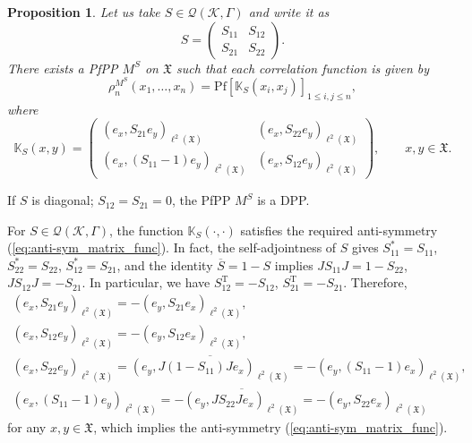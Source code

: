 \documentclass[11pt]{article}
\numberwithin{equation}{section}
\numberwithin{equation}{section}
\newtheorem{Proposition}[Theorem]{Proposition}
 { \theoremstyle{definition}
\newtheorem{Definition}[Theorem]{Definition}
\newtheorem{Example}[Theorem]{Example}
\newtheorem{Remark}[Theorem]{Remark} }
\newcommand{\mfrak}[1]{\mathfrak{#1}}
\newcommand{\mcal}[1]{\mathcal{#1}}
\newcommand{\mbb}[1]{\mathbb{#1}}
\newcommand{\mrm}[1]{\mathrm{#1}}
\begin{document}
\begin{Proposition}\label{prop:existence_ppp}
Let us take $S\in\mcal{Q}(\mcal{K},\Gamma)$ and write it as
\begin{equation*}
	S=\left(
	\begin{matrix}
		S_{11} & S_{12} \\
		S_{21} & S_{22}
	\end{matrix}
	\right).
\end{equation*}
There exists a PfPP $M^{S}$ on $\mfrak{X}$ such that each correlation function is given by
\begin{equation*}
	\rho^{M^{S}}_{n}(x_{1},\dots, x_{n})=\mrm{Pf} [\mbb{K}_{S}(x_{i},x_{j}) ]_{1\le i,j\le n},
\end{equation*}
where
\begin{equation}
\label{eq:matrix_kernel_S}
	\mbb{K}_{S}(x,y)=\left(
	\begin{matrix}
		(e_{x},S_{21}e_{y})_{\ell^{2}(\mfrak{X})} & (e_{x},S_{22}e_{y})_{\ell^{2}(\mfrak{X})} \\
		(e_{x},(S_{11}-1)e_{y})_{\ell^{2}(\mfrak{X})} & (e_{x},S_{12}e_{y})_{\ell^{2}(\mfrak{X})}
	\end{matrix}
	\right),\qquad x,y\in\mfrak{X}.
\end{equation}
\end{Proposition}

\begin{Remark}
If $S$ is diagonal; $S_{12}=S_{21}=0$, the PfPP $M^{S}$ is a DPP.
\end{Remark}

\begin{Remark}
\label{rem:check_anti-sym_matrix_func}
For $S\in\mcal{Q}(\mcal{K},\Gamma)$, the function $\mbb{K}_{S}(\cdot,\cdot)$ satisfies the required anti-symmetry (\ref{eq:anti-sym_matrix_func}). In fact, the self-adjointness of $S$ gives $S_{11}^{\ast}=S_{11}$, $S_{22}^{\ast}=S_{22}$, $S_{12}^{\ast}=S_{21}$, and the identity $\overline{S}=1-S$ implies $JS_{11}J=1-S_{22}$, $JS_{12}J=-S_{21}$. In particular, we have $S_{12}^{\mrm{T}}=-S_{12}$, $S_{21}^{\mrm{T}}=-S_{21}$. Therefore,
\begin{gather*}
	(e_{x},S_{21}e_{y})_{\ell^{2}(\mfrak{X})} =-(e_{y},S_{21}e_{x})_{\ell^{2}(\mfrak{X})},\\
	(e_{x},S_{12}e_{y})_{\ell^{2}(\mfrak{X})} =-(e_{y},S_{12}e_{x})_{\ell^{2}(\mfrak{X})}, \\
	(e_{x},S_{22}e_{y})_{\ell^{2}(\mfrak{X})} =\overline{(e_{y},J(1-S_{11})Je_{x})_{\ell^{2}(\mfrak{X})}}=-(e_{y},(S_{11}-1)e_{x})_{\ell^{2}(\mfrak{X})}, \\
(e_{x},(S_{11}-1)e_{y})_{\ell^{2}(\mfrak{X})}=-\overline{(e_{y},JS_{22}Je_{x})_{\ell^{2}(\mfrak{X})}}=-(e_{y},S_{22}e_{x})_{\ell^{2}(\mfrak{X})}
\end{gather*}
for any $x,y\in\mfrak{X}$, which implies the anti-symmetry (\ref{eq:anti-sym_matrix_func}).
\end{Remark}
\end{document}
